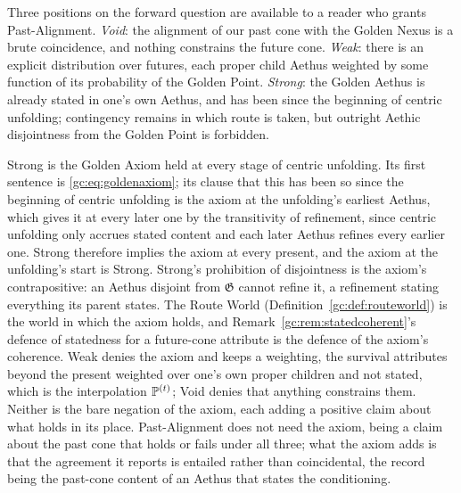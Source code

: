 \begin{remark}
\label{gc:rem:axiomhypotheses}
Three positions on the forward question are available to a reader who
grants Past-Alignment. \emph{Void}: the alignment of our past cone with
the Golden Nexus is a brute coincidence, and nothing constrains the
future cone. \emph{Weak}: there is an explicit distribution over futures,
each proper child Aethus weighted by some function of its probability of
the Golden Point. \emph{Strong}: the Golden Aethus is already stated in
one's own Aethus, and has been since the beginning of centric unfolding;
contingency remains in which route is taken, but outright Aethic
disjointness from the Golden Point is forbidden.

Strong is the Golden Axiom held at every stage of centric unfolding. Its
first sentence is \eqref{gc:eq:goldenaxiom}; its clause that this has
been so since the beginning of centric unfolding is the axiom at the
unfolding's earliest Aethus, which gives it at every later one by the
transitivity of refinement, since centric unfolding only accrues stated
content and each later Aethus refines every earlier one. Strong
therefore implies the axiom at every present, and the axiom at the
unfolding's start is Strong. Strong's prohibition of disjointness is the
axiom's contrapositive: an Aethus disjoint from $\mathfrak G$ cannot
refine it, a refinement stating everything its parent states. The Route
World (Definition~\ref{gc:def:routeworld}) is the world in which the
axiom holds, and Remark~\ref{gc:rem:statedcoherent}'s defence of
statedness for a future-cone attribute is the defence of the axiom's
coherence. Weak denies the axiom and keeps a weighting, the survival
attributes beyond the present weighted over one's own proper children
and not stated, which is the interpolation $\mathbb{P}^{(t)}$; Void denies that
anything constrains them. Neither is the bare negation of the axiom, each
adding a positive claim about what holds in its place. Past-Alignment
does not need the axiom, being a claim about the past cone that holds or
fails under all three; what the axiom adds is that the agreement it
reports is entailed rather than coincidental, the record being the
past-cone content of an Aethus that states the conditioning.
\end{remark}

